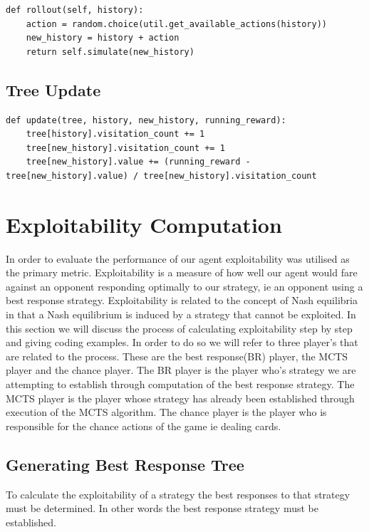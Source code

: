 \begin{lstlisting}[style=Python]
def rollout(self, history):
    action = random.choice(util.get_available_actions(history))
    new_history = history + action
    return self.simulate(new_history)
\end{lstlisting}

\subsection{Tree Update}\label{subsec:treeUpdate}

\begin{lstlisting}[style=Python]
def update(tree, history, new_history, running_reward):
    tree[history].visitation_count += 1
    tree[new_history].visitation_count += 1
    tree[new_history].value += (running_reward - tree[new_history].value) / tree[new_history].visitation_count
\end{lstlisting}

\section{Exploitability Computation}\label{sec:bestResponseComputation}
In order to evaluate the performance of our agent exploitability was utilised as the primary metric.
Exploitability is a measure of how well our agent would fare against an opponent responding
optimally to our strategy, ie an opponent using a best response strategy.
Exploitability is related to the concept of Nash equilibria in that a Nash equilibrium
is induced by a strategy that cannot be exploited.
In this section we will discuss the process of calculating exploitability step by step and giving coding examples.
In order to do so we will refer to three player's that are related to the process.
These are the best response(BR) player, the MCTS player and the chance player.
The BR player is the player who's strategy we are attempting to establish through computation
of the best response strategy.
The MCTS player is the player whose strategy has already been established through execution of the MCTS algorithm.
The chance player is the player who is responsible for the chance actions of the game ie dealing cards.

\subsection{Generating Best Response Tree}\label{subsec:applyMCTS}
To calculate the exploitability of a strategy the best responses to that strategy must be
determined.
In other words the best response strategy must be established.

